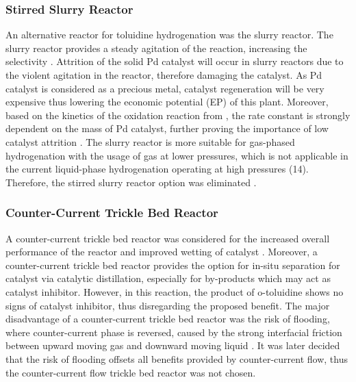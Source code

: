 \subsubsection{Stirred Slurry Reactor}
An alternative reactor for toluidine hydrogenation was the slurry reactor. The slurry reactor provides a steady agitation of the reaction, increasing the selectivity \cite{p_a_ramachandran_recent_1987}. Attrition of the solid Pd catalyst will occur in slurry reactors due to the violent agitation in the reactor, therefore damaging the catalyst. As Pd catalyst is considered as a precious metal, catalyst regeneration will be very expensive thus lowering the economic potential (EP) of this plant. Moreover, based on the kinetics of the oxidation reaction from  , the rate constant is strongly dependent on the mass of Pd catalyst, further proving the importance of low catalyst attrition \cite{rajadhyaksha_solvent_1986}.
The slurry reactor is more suitable for gas-phased hydrogenation with the usage of  gas at lower pressures, which is not applicable in the current liquid-phase hydrogenation operating at high pressures (\SI{14}{\atm}). Therefore, the stirred slurry reactor option was eliminated \cite{ranade_chapter_2011}.


\subsubsection{Counter-Current Trickle Bed Reactor}
A counter-current trickle bed reactor was considered for the increased overall performance of the reactor and improved wetting of catalyst \cite{kundu_novel_2003}. Moreover, a counter-current trickle bed reactor provides the option for in-situ separation for catalyst via catalytic distillation, especially for by-products which may act as catalyst inhibitor. However, in this reaction, the product of o-toluidine shows no signs of catalyst inhibitor, thus disregarding the proposed benefit. The major disadvantage of a counter-current trickle bed reactor was the risk of flooding, where counter-current phase is reversed, caused by the strong interfacial friction between upward moving gas and downward moving liquid \cite{breijer_prevention_2008}. It was later decided that the risk of flooding offsets all benefits provided by counter-current flow, thus the counter-current flow trickle bed reactor was not chosen. 

